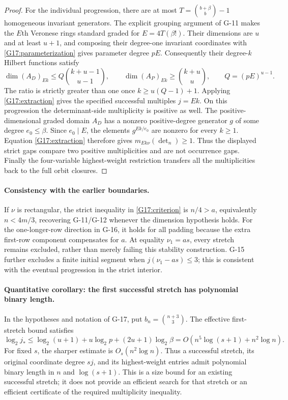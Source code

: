 \begin{proof}
For the individual progression, there are at most
$T=\binom{b+\beta}{b}-1$ homogeneous invariant generators.
The explicit grouping argument of G-11 makes the $E$th Veronese
rings standard graded for $E=4T(\beta!)$.
Their dimensions are $u$ and at least $u+1$, and composing their
degree-one invariant coordinates with \eqref{G17:parameterization}
gives parameter degree $pE$. Consequently their degree-$k$ Hilbert
functions satisfy
\[
 \dim(A_D)_{Ek}\leq Q\binom{k+u-1}{u-1},\qquad
 \dim(A_P)_{Ek}\geq\binom{k+u}{u},\qquad Q=(pE)^{u-1}.
\]
The ratio is strictly greater than one once
$k\geq u(Q-1)+1$. Applying \eqref{G17:extraction} gives the
specified successful multiples $j=Ek$.
On this progression the determinant-side multiplicity is positive as
well. The positive-dimensional graded domain $A_D$ has a nonzero
positive-degree generator $g$ of some degree $e_0\leq\beta$.
Since $e_0\mid E$, the elements $g^{Ek/e_0}$ are nonzero for every
$k\geq1$. Equation \eqref{G17:extraction} therefore gives
$m_{Ek\nu}(\det_n)\geq1$. Thus the displayed strict gaps compare
two positive multiplicities and are not occurrence gaps.
Finally the four-variable highest-weight restriction transfers
all the multiplicities back to the full orbit closures.
\end{proof}

\paragraph{Consistency with the earlier boundaries.}
If $\nu$ is rectangular, the strict inequality in
\eqref{G17:criterion} is $n/4>a$, equivalently $n<4m/3$,
recovering G-11/G-12 whenever the dimension hypothesis holds.
For the one-longer-row direction in G-16, it holds for all padding
because the extra first-row component compensates for $a$.
At equality $\nu_1=as$, every stretch remains excluded, rather
than merely failing this stability construction.
G-15 further excludes a finite initial segment when
$j(\nu_1-as)\leq3$; this is consistent with the eventual
progression in the strict interior.


\paragraph{Quantitative corollary: the first successful stretch has polynomial binary length.}
In the hypotheses and notation of G-17, put
$b_n=\binom{n+3}{3}$. The effective first-stretch bound satisfies
\begin{equation}\label{G17:bitlength}
 \log_2j_*
 \leq\log_2(u+1)+u\log_2p+(2u+1)\log_2\beta
 =O\!\left(n^5\log(s+1)+n^2\log n\right).
\end{equation}
For fixed $s$, the sharper estimate is $O_s(n^2\log n)$.
Thus a successful stretch, its original coordinate degree $sj$, and
its highest-weight entries admit polynomial binary length in $n$ and
$\log(s+1)$. This is a size bound for an existing successful stretch;
it does not provide an efficient search for that stretch or an efficient
certificate of the required multiplicity inequality.

